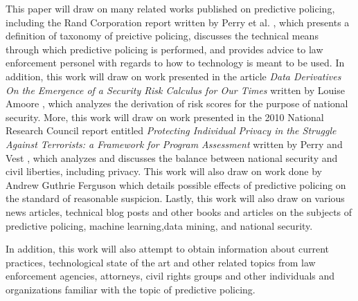 \documentclass[12pt]{article} %
\begin{document}
This paper will draw on many related works published on predictive policing, including the Rand Corporation report written by Perry et al. \cite{perryetal}, which presents a definition of taxonomy of preictive policing, discusses the technical means through which predictive policing is performed, and provides advice to law enforcement personel with regards to how to technology is meant to be used. In addition, this work will draw on work presented in the article \emph{Data Derivatives On the Emergence of a Security Risk Calculus for Our Times} written by Louise Amoore \cite{amoore2011data}, which analyzes the derivation of risk scores for the purpose of national security. More, this work will draw on work presented in the 2010 National Research Council report entitled \emph{Protecting Individual Privacy in the Struggle Against Terrorists: a Framework for Program Assessment} written by Perry and Vest \cite{perryprotecting}, which analyzes and discusses the balance between national security and civil liberties, including privacy. This work will also draw on work done by Andrew Guthrie Ferguson which details possible effects of predictive policing on the standard of reasonable suspicion. \cite{ferguson2012predictive} Lastly, this work will also draw on various news articles, technical blog posts and other books and articles on the subjects of predictive policing, machine learning,data mining, and national security. \cite{hildebrandt2013privacy} \cite{hardt} \cite{robinson2014civil}
\cite{intercept}

In addition, this work will also attempt to obtain information about current practices, technological state of the art and other related topics from law enforcement agencies, attorneys, civil rights groups and other individuals and organizations familiar with the topic of predictive policing.\cite{dekota}






\end{document}
